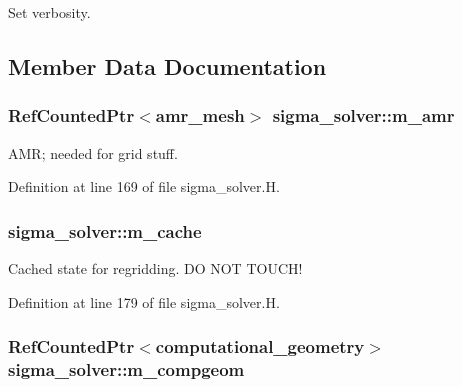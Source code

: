 Set verbosity. 



\subsection{Member Data Documentation}
\subsubsection[{\texorpdfstring{m\+\_\+amr}{m_amr}}]{\setlength{\rightskip}{0pt plus 5cm}Ref\+Counted\+Ptr$<${\bf amr\+\_\+mesh}$>$ sigma\+\_\+solver\+::m\+\_\+amr\hspace{0.3cm}{\ttfamily [protected]}}\hypertarget{classsigma__solver_a532a075d343627ca06291ca12f3adfee}{}\label{classsigma__solver_a532a075d343627ca06291ca12f3adfee}


A\+MR; needed for grid stuff. 



Definition at line 169 of file sigma\+\_\+solver.\+H.

\subsubsection[{\texorpdfstring{m\+\_\+cache}{m_cache}}]{ sigma\+\_\+solver\+::m\+\_\+cache\hspace{0.3cm}{\ttfamily [protected]}}\hypertarget{classsigma__solver_a3545d970d92cc5f7ccb7b17e1955676f}{}\label{classsigma__solver_a3545d970d92cc5f7ccb7b17e1955676f}


Cached state for regridding. DO N\+OT T\+O\+U\+C\+H! 



Definition at line 179 of file sigma\+\_\+solver.\+H.

\subsubsection[{\texorpdfstring{m\+\_\+compgeom}{m_compgeom}}]{\setlength{\rightskip}{0pt plus 5cm}Ref\+Counted\+Ptr$<${\bf computational\+\_\+geometry}$>$ sigma\+\_\+solver\+::m\+\_\+compgeom\hspace{0.3cm}{\ttfamily [protected]}}\hypertarget{classsigma__solver_ae8b14974dacba915d5639ebb8aca2e77}{}\label{classsigma__solver_ae8b14974dacba915d5639ebb8aca2e77}


